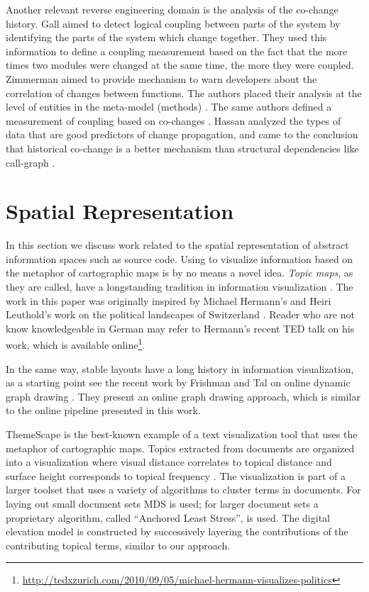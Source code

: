 Another relevant reverse engineering domain is the analysis of the co-change history.
%
Gall \etal aimed to detect logical coupling between parts of the system \cite{Gall98a} by identifying the parts of the system which change together. They used this information to define a coupling measurement based on the fact that the more times two modules were changed at the same time, the more they were coupled.
%
Zimmerman \etal aimed to provide mechanism to warn developers about the correlation of changes between functions. The authors placed their analysis at the level of entities in the meta-model (\eg methods) \cite{Zimm04a}. The same authors defined a measurement of coupling based on co-changes \cite{Zimm03a}.
%
Hassan \etal analyzed the  types of data that are good predictors of change propagation, and came to the conclusion that historical co-change is a better mechanism than structural dependencies like call-graph \cite{Hass04a}.

\section{Spatial Representation}

In this section we discuss work related to the spatial representation of abstract information spaces such as source code. Using \mds to visualize information based on the metaphor of cartographic maps is by no means a novel idea. \emph{Topic maps}, as they are called, have a longstanding tradition in information visualization \cite{Ware00a}. The work in this paper was originally inspired by Michael Hermann's and Heiri Leuthold's work on the political landscapes of Switzerland \cite{Herm03a}. Reader who are not know knowledgeable in German may refer to Hermann's recent TED talk on his work, which is available online\footnote{\url{http://tedxzurich.com/2010/09/05/michael-hermann-visualizes-politics}}.

In the same way, stable layouts have a long history in information visualization, as a starting point see \eg the recent work by Frishman and Tal on online dynamic graph drawing \cite{Fris08a}. They present an online graph drawing approach, which is similar to the online pipeline presented in this work.

ThemeScape is the best-known example of a text visualization tool that uses the metaphor of cartographic maps. 
Topics extracted from documents are organized into a visualization where visual distance correlates to topical distance and surface height corresponds to topical frequency \cite{Wise95b}. The visualization is part of a larger toolset that uses a variety of algorithms to cluster terms in documents. For laying out small document sets MDS is used; for larger document sets a proprietary algorithm, called ``Anchored Least Stress'', is used. The digital elevation model is constructed by successively layering the contributions of the contributing topical terms, similar to our approach.

